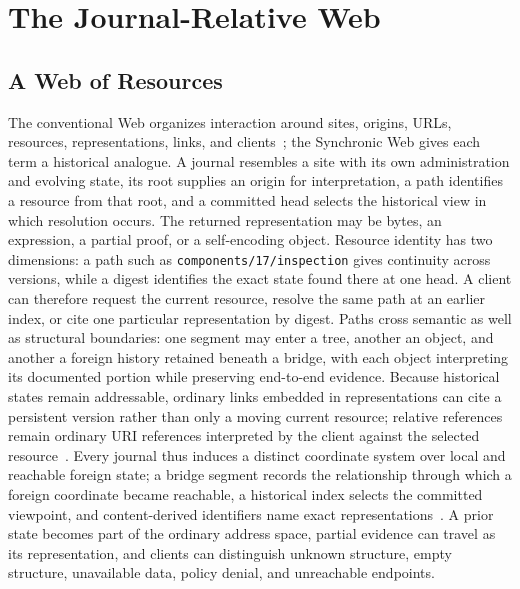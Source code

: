 \section{The Journal-Relative Web}
\label{sec:journal-web}
\label{sec:paths}
\label{sec:policy}

\subsection{A Web of Resources}

The conventional Web organizes interaction around sites, origins, URLs, resources, representations, links, and clients~\cite{Jacobs2004webarch,BernersLee2005uri}; the Synchronic Web gives each term a historical analogue. A journal resembles a site with its own administration and evolving state, its root supplies an origin for interpretation, a path identifies a resource from that root, and a committed head selects the historical view in which resolution occurs. The returned representation may be bytes, an expression, a partial proof, or a self-encoding object. Resource identity has two dimensions: a path such as \texttt{components/17/\allowbreak inspection} gives continuity across versions, while a digest identifies the exact state found there at one head. A client can therefore request the current resource, resolve the same path at an earlier index, or cite one particular representation by digest. Paths cross semantic as well as structural boundaries: one segment may enter a tree, another an object, and another a foreign history retained beneath a bridge, with each object interpreting its documented portion while preserving end-to-end evidence. Because historical states remain addressable, ordinary links embedded in representations can cite a persistent version rather than only a moving current resource; relative references remain ordinary URI references interpreted by the client against the selected resource~\cite{Rivest1996sdsi,Mazieres1998path}. Every journal thus induces a distinct coordinate system over local and reachable foreign state; a bridge segment records the relationship through which a foreign coordinate became reachable, a historical index selects the committed viewpoint, and content-derived identifiers name exact representations~\cite{Haber1997secure,Kuhn2014trusty,Zhang2014named}. A prior state becomes part of the ordinary address space, partial evidence can travel as its representation, and clients can distinguish unknown structure, empty structure, unavailable data, policy denial, and unreachable endpoints.

